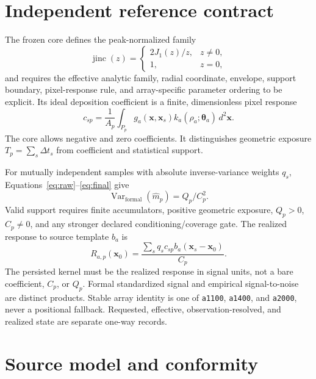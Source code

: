 \documentclass[10pt]{article}
\newcommand{\jinc}{\operatorname{jinc}}
\begin{document}
\section{Independent reference contract}

The frozen core defines the peak-normalized family
\begin{equation}
  \jinc(z)=\begin{cases}2J_1(z)/z,&z\ne0,\\1,&z=0,\end{cases}
\end{equation}
and requires the effective analytic family, radial coordinate, envelope,
support boundary, pixel-response rule, and array-specific parameter ordering
to be explicit.  Its ideal deposition coefficient is a finite,
dimensionless pixel response
\begin{equation}
  c_{sp}=\frac{1}{A_p}\int_{P_p}g_a(\boldsymbol{x},\boldsymbol{x}_s)
  k_a(\rho_a;\boldsymbol{\theta}_a)\,d^2\boldsymbol{x}.
\end{equation}
The core allows negative and zero coefficients.  It distinguishes geometric
exposure $T_p=\sum_s\Delta t_s$ from coefficient and statistical support.

For mutually independent samples with absolute inverse-variance weights
$q_s$, Equations~\eqref{eq:raw}--\eqref{eq:final} give
\begin{equation}
  \operatorname{Var}_{\mathrm{formal}}(\widehat m_p)=Q_p/C_p^2.
\end{equation}
Valid support requires finite accumulators, positive geometric exposure,
$Q_p>0$, $C_p\ne0$, and any stronger declared conditioning/coverage gate.
The realized response to source template $b_a$ is
\begin{equation}
  R_{a,p}(\boldsymbol{x}_0)=
  \frac{\sum_s q_sc_{sp}b_a(\boldsymbol{x}_s-\boldsymbol{x}_0)}{C_p}.
  \label{eq:response}
\end{equation}
The persisted kernel must be the realized response in signal units, not a bare
coefficient, $C_p$, or $Q_p$.  Formal standardized signal and empirical
signal-to-noise are distinct products.  Stable array identity is one of
\texttt{a1100}, \texttt{a1400}, and \texttt{a2000}, never a positional
fallback.  Requested, effective, observation-resolved, and realized state are
separate one-way records.

\section{Source model and conformity}
\end{document}
